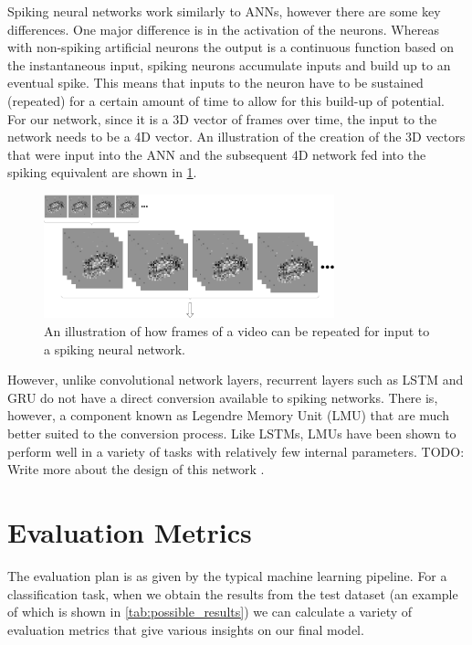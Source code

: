 Spiking neural networks work similarly to ANNs, however there are some key differences. One major difference is in the activation of the neurons. Whereas with non-spiking artificial neurons the output is a continuous function based on the instantaneous input, spiking neurons accumulate inputs and build up to an eventual spike. This means that inputs to the neuron have to be sustained (repeated) for a certain amount of time to allow for this build-up of potential. For our network, since it is a 3D vector of frames over time, the input to the network needs to be a 4D vector. An illustration of the creation of the 3D vectors that were input into the ANN and the subsequent 4D network fed into the spiking equivalent are shown in \cref{fig:sustained_video}.

\begin{figure}[htb]
    \centering
    \includegraphics[width=0.75\textwidth]{analysisanddesign/images/sustained_video.png}
    \caption{An illustration of how frames of a video can be repeated for input to a spiking neural network.}
    \label{fig:sustained_video}
\end{figure}

However, unlike convolutional network layers, recurrent layers such as LSTM and GRU do not have a direct conversion available to spiking networks. There is, however, a component known as Legendre Memory Unit (LMU) that are much better suited to the conversion process. Like LSTMs, LMUs have been shown to perform well in a variety of tasks with relatively few internal parameters\cite{LMU}. \color{red} TODO: Write more about the design of this network \color{black}.

\section{Evaluation Metrics} \label{sec:evalutaion_metrics}

The evaluation plan is as given by the typical machine learning pipeline\cite{IntroToML}. For a classification task, when we obtain the results from the test dataset (an example of which is shown in \cref{tab:possible_results}) we can calculate a variety of evaluation metrics that give various insights on our final model.

